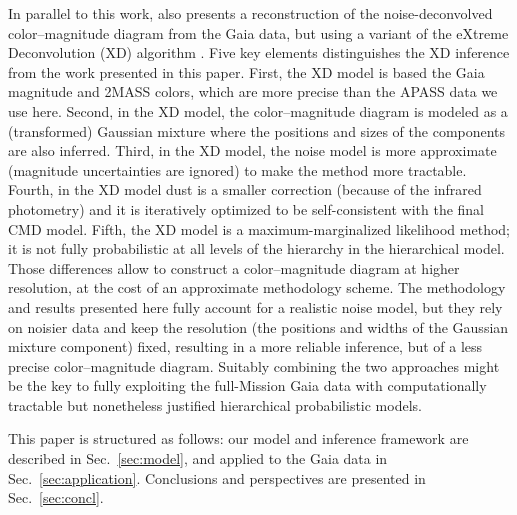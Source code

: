 \documentclass[manuscript, letterpaper]{aastex6}
\makeatletter
\let\origsection\section
\renewcommand\section{\@ifstar{\starsection}{\nostarsection}}
\newcommand\nostarsection[1]{\sectionprelude\origsection{#1}}
\newcommand\starsection[1]{\sectionprelude\origsection*{#1}}
\newcommand\sectionprelude{\vspace{1em}}
\newcommand{\secref}[1]{{\xspace}Sec.~\ref{#1}}
\makeatother
\begin{document}
In parallel to this work, \cite{Anderson2017} also presents a reconstruction of the noise-deconvolved color--magnitude diagram from the Gaia data, but using a variant of the eXtreme Deconvolution (XD) algorithm \cite{bovy2011}.
Five key elements distinguishes the XD inference from the work presented in this paper.
First, the XD model is based the Gaia magnitude and 2MASS colors, which are more precise than the APASS data we use here.
Second, in the XD model, the color--magnitude diagram is modeled as a (transformed) Gaussian mixture where the positions and sizes of the components are also inferred.
Third, in the XD model, the noise model is more approximate (magnitude uncertainties are ignored) to make the method more tractable.
Fourth, in the XD model dust is a smaller correction (because of the infrared photometry) and it is iteratively optimized to be self-consistent with the final CMD model.
Fifth, the XD model is a maximum-marginalized likelihood method; it is not fully probabilistic at all levels of the hierarchy in the hierarchical model.
Those differences allow \cite{Anderson2017} to construct a color--magnitude diagram at higher resolution, at the cost of an approximate methodology scheme.
The methodology and results presented here fully account for a realistic noise model, but they rely on noisier data and keep the resolution (the positions and widths of the Gaussian mixture component) fixed, resulting in a more reliable inference, but of a less precise color--magnitude diagram.
Suitably combining the two approaches might be the key to fully exploiting the full-Mission Gaia data with computationally tractable but nonetheless justified hierarchical probabilistic models.

This paper is structured as follows: our model and inference framework are described in \secref{sec:model}, and applied to the Gaia data in \secref{sec:application}. 
Conclusions and perspectives are presented in \secref{sec:concl}.


\section{Model}\label{sec:model}
\end{document}
